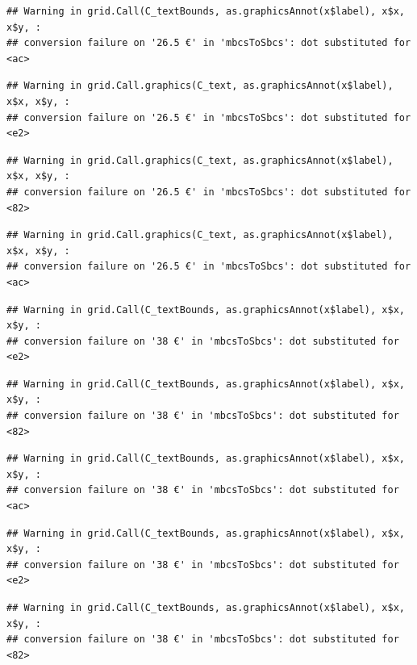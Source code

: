 \documentclass[
]{article}
\begin{document}
\begin{verbatim}
## Warning in grid.Call(C_textBounds, as.graphicsAnnot(x$label), x$x, x$y, :
## conversion failure on '26.5 €' in 'mbcsToSbcs': dot substituted for <ac>
\end{verbatim}

\begin{verbatim}
## Warning in grid.Call.graphics(C_text, as.graphicsAnnot(x$label), x$x, x$y, :
## conversion failure on '26.5 €' in 'mbcsToSbcs': dot substituted for <e2>
\end{verbatim}

\begin{verbatim}
## Warning in grid.Call.graphics(C_text, as.graphicsAnnot(x$label), x$x, x$y, :
## conversion failure on '26.5 €' in 'mbcsToSbcs': dot substituted for <82>
\end{verbatim}

\begin{verbatim}
## Warning in grid.Call.graphics(C_text, as.graphicsAnnot(x$label), x$x, x$y, :
## conversion failure on '26.5 €' in 'mbcsToSbcs': dot substituted for <ac>
\end{verbatim}

\begin{verbatim}
## Warning in grid.Call(C_textBounds, as.graphicsAnnot(x$label), x$x, x$y, :
## conversion failure on '38 €' in 'mbcsToSbcs': dot substituted for <e2>
\end{verbatim}

\begin{verbatim}
## Warning in grid.Call(C_textBounds, as.graphicsAnnot(x$label), x$x, x$y, :
## conversion failure on '38 €' in 'mbcsToSbcs': dot substituted for <82>
\end{verbatim}

\begin{verbatim}
## Warning in grid.Call(C_textBounds, as.graphicsAnnot(x$label), x$x, x$y, :
## conversion failure on '38 €' in 'mbcsToSbcs': dot substituted for <ac>
\end{verbatim}

\begin{verbatim}
## Warning in grid.Call(C_textBounds, as.graphicsAnnot(x$label), x$x, x$y, :
## conversion failure on '38 €' in 'mbcsToSbcs': dot substituted for <e2>
\end{verbatim}

\begin{verbatim}
## Warning in grid.Call(C_textBounds, as.graphicsAnnot(x$label), x$x, x$y, :
## conversion failure on '38 €' in 'mbcsToSbcs': dot substituted for <82>
\end{verbatim}
\end{document}
